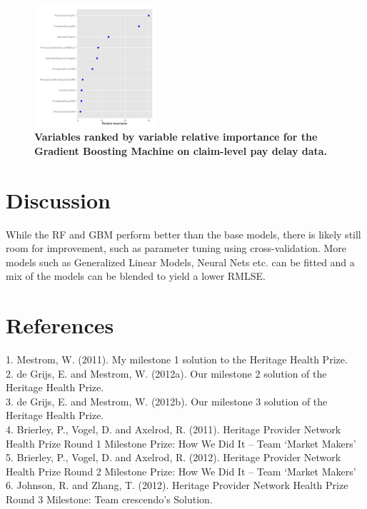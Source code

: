 \documentclass[8pt]{article}
\begin{document}
\begin{figure}[htbp]
	\begin{center}
		\includegraphics[width = 0.4\textwidth]{results/gbm-paydelay-importance.pdf}
		\caption{{\bf Variables ranked by variable relative importance for the Gradient Boosting Machine on claim-level pay delay data.}}
		\label{fig:importance-paydelay}
	\end{center}
\end{figure}

\section{Discussion} 
\label{sec:discussion}
While the RF and GBM perform better than the base models, there is likely still room for improvement, such as parameter tuning using cross-validation. More models such as Generalized Linear Models, Neural Nets etc. can be fitted and a mix of the models can be blended to yield a lower RMLSE.
\section{References}
{\tiny
1. Mestrom, W. (2011). My milestone 1 solution to the Heritage Health Prize. \\
2. de Grijs, E. and Mestrom, W. (2012a). Our milestone 2 solution of the Heritage Health Prize.\\
3. de Grijs, E. and Mestrom, W. (2012b). Our milestone 3 solution of the Heritage Health Prize.\\
4. Brierley, P., Vogel, D. and Axelrod, R. (2011). Heritage Provider Network Health Prize Round 1 Milestone Prize: How We Did It – Team `Market Makers'\\
5. Brierley, P., Vogel, D. and Axelrod, R. (2012). Heritage Provider Network Health Prize Round 2 Milestone Prize: How We Did It – Team `Market Makers'\\
6. Johnson, R. and Zhang, T. (2012). Heritage Provider Network Health Prize Round 3 Milestone: Team crescendo’s Solution.
}
\end{document}
